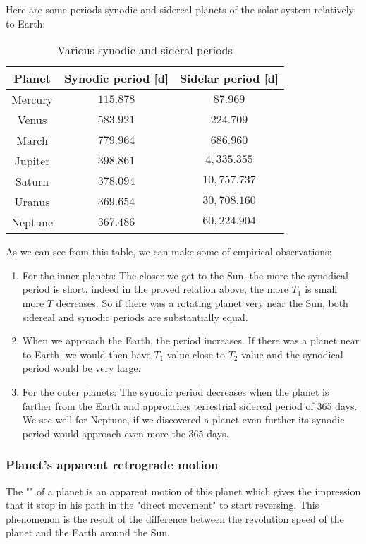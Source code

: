 	Here are some periods synodic and sidereal planets of the solar system relatively to Earth:
	\begin{table}[H]
	\begin{center}
			\begin{tabular}{|c|c|c|}
				\hline
				\multicolumn{1}{c}{\cellcolor{black!30}\textbf{Planet}} & 
\multicolumn{1}{c}{\cellcolor{black!30}\textbf{Synodic period [d]}} & 
\multicolumn{1}{c}{\cellcolor{black!30}\textbf{Sidelar period [d]}}  \\ \hline
		Mercury & $115.878$ & $87.969$\\ \hline
		Venus & $583.921$ & $224.709$\\ \hline
		March & $779.964$ & $686.960$\\ \hline
		Jupiter & $398.861$ & $4,335.355$\\ \hline
		Saturn & $378.094$ & $10,757.737$\\ \hline
		Uranus & $369.654$ & $30,708.160$\\ \hline
		Neptune & $367.486$ & $60,224.904$\\ \hline
	\end{tabular}
	\end{center}
	\caption{Various synodic and sideral periods}
	\end{table}	
	As we can see from this table, we can make some of empirical observations:
	\begin{enumerate}
		\item For the inner planets: The closer we get to the Sun, the more the synodical period is short, indeed in the proved relation above, the more $T_1$ is small more $T$ decreases. So if there was a rotating planet very near the Sun, both sidereal and synodic periods are substantially equal.

		\item When we approach the Earth, the period increases. If there was a planet near to Earth, we would then have $T_1$ value close to $T_2$ value and the synodical period would be very large.

		\item For the outer planets: The synodic period decreases when the planet is farther from the Earth and approaches terrestrial sidereal period of $365$ days. We see well for Neptune, if we discovered a planet even further its synodic period would approach even more the $365$ days.
	\end{enumerate}
	
	\pagebreak
	\subsubsection{Planet's apparent retrograde motion}
	The "" of a planet is an apparent motion of this planet which gives the impression that it stop in his path in the "direct movement" to start reversing. This phenomenon is the result of the difference between the revolution speed of the planet and the Earth around the Sun.


